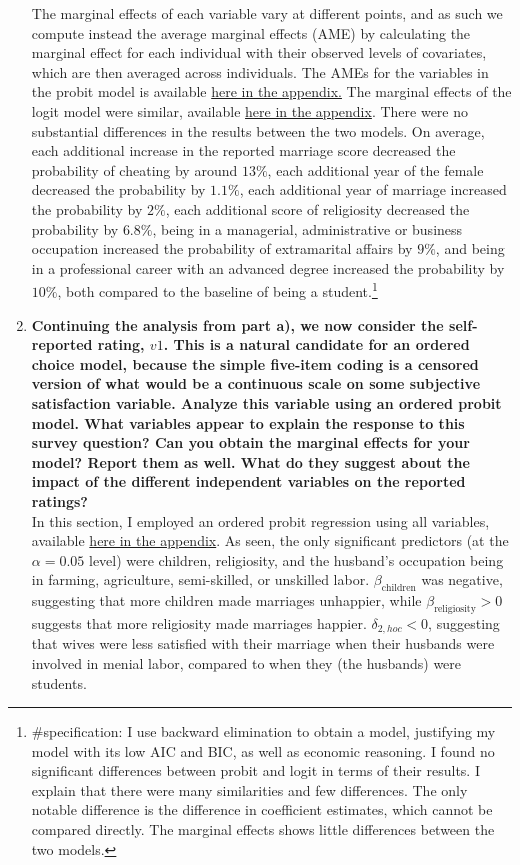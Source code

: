 \documentclass{article}
\begin{document}
\begin{enumerate}[label=(\alph*)]
The marginal effects of each variable vary at different points, and as such we compute instead the average marginal effects (AME) by calculating the marginal effect for each individual with their observed levels of covariates, which are then averaged across individuals. The AMEs for the variables in the probit model is available \hyperlink{probitame}{here in the appendix.} The marginal effects of the logit model were similar, available \hyperlink{logitame}{here in the appendix}. There were no substantial differences in the results between the two models. On average, each additional increase in the reported marriage score decreased the probability of cheating by around $13\%$, each additional year of the female decreased the probability by $1.1\%$, each additional year of marriage increased the probability by $2\%$, each additional score of religiosity decreased the probability by $6.8\%$, being in a managerial, administrative or business occupation increased the probability of extramarital affairs by $9\%$, and being in a professional career with an advanced degree increased the probability by $10\%$, both compared to the baseline of being a student.\footnote{\#specification: I use backward elimination to obtain a model, justifying my model with its low AIC and BIC, as well as economic reasoning. I found no significant differences between probit and logit in terms of their results. I explain that there were many similarities and few differences. The only notable difference is the difference in coefficient estimates, which cannot be compared directly. The marginal effects shows little differences between the two models.}\\


\item \textbf{Continuing the analysis from part a), we now consider the self-reported rating, $v1$. This is a natural candidate for an ordered choice model, because the simple five-item coding is a censored version of what would be a continuous scale on some subjective satisfaction variable. Analyze this variable using an ordered probit model. What variables appear to explain the response to this survey question? Can you obtain the marginal effects for your model? Report them as well. What do they suggest about the impact of the different independent variables on the reported ratings?}\\

In this section, I employed an ordered probit regression using all variables, available \hyperlink{oprobit}{here in the appendix}. As seen, the only significant predictors (at the $\alpha = 0.05$ level) were children, religiosity, and the husband's occupation being in farming, agriculture, semi-skilled, or unskilled labor. $\beta_{\text{children}}$ was negative, suggesting that more children made marriages unhappier, while $\beta_{\text{religiosity}} > 0$ suggests that more religiosity made marriages happier. $\delta_{2,hoc} < 0$, suggesting that wives were less satisfied with their marriage when their husbands were involved in menial labor, compared to when they (the husbands) were students.\\


\end{enumerate}
\end{document}
